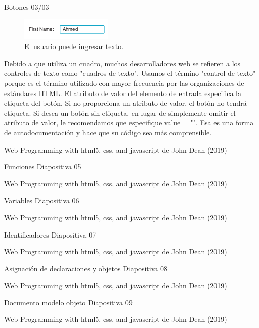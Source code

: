 \begin{frame}{Botones 03/03}
\justifying
\begin{figure}[H]
\centering
\includegraphics[scale=0.5]{Section_Files/images/Sec01/04.png}
\caption{El usuario puede ingresar texto.}
\end{figure}
Debido a que utiliza un cuadro, muchos desarrolladores web se refieren a los controles de texto como "cuadros de texto". Usamos el término "control de texto" porque es el término utilizado con mayor frecuencia por las organizaciones de estándares HTML.
El atributo de valor del elemento de entrada especifica la etiqueta del botón. Si no proporciona un atributo de valor, el botón no tendrá etiqueta. Si desea un botón sin etiqueta, en lugar de simplemente omitir el atributo de valor, le recomendamos que especifique value = "". Esa es una forma de autodocumentación y hace que su código sea más comprensible.


{\tiny Web Programming with html5, css, and javascript de John Dean (2019)}
\end{frame}

\begin{frame}{Funciones}
\justifying
Diapositiva 05


{\tiny Web Programming with html5, css, and javascript de John Dean (2019)}
\end{frame}

\begin{frame}{Variables}
\justifying
Diapositiva 06


{\tiny Web Programming with html5, css, and javascript de John Dean (2019)}
\end{frame}

\begin{frame}{Identificadores}
\justifying
Diapositiva 07


{\tiny Web Programming with html5, css, and javascript de John Dean (2019)}
\end{frame}

\begin{frame}{Asignación de declaraciones y objetos}
\justifying
Diapositiva 08


{\tiny Web Programming with html5, css, and javascript de John Dean (2019)}
\end{frame}

\begin{frame}{Documento modelo objeto}
\justifying
Diapositiva 09


{\tiny Web Programming with html5, css, and javascript de John Dean (2019)}
\end{frame}

